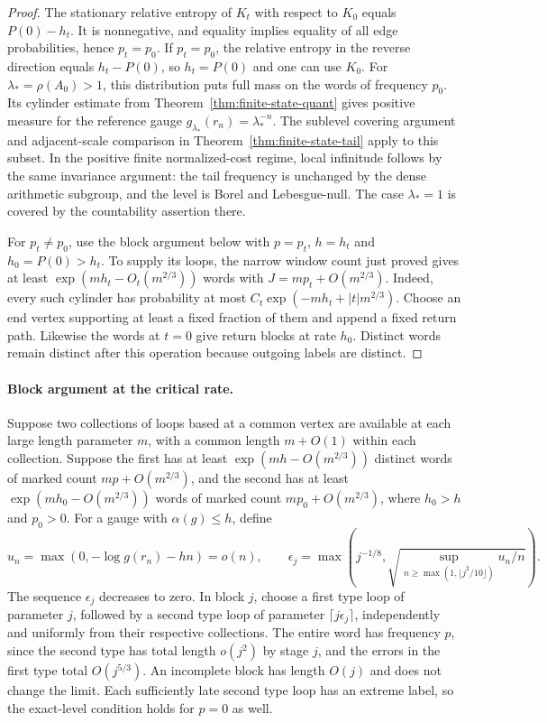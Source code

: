 \documentclass[11pt]{article}
\theoremstyle{definition}
\theoremstyle{remark}
\begin{document}
\begin{proof}
The stationary relative entropy of $K_t$ with respect to $K_0$
equals $P(0)-h_t$. It is nonnegative, and equality implies equality
of all edge probabilities, hence $p_t=p_0$. If $p_t=p_0$, the
relative entropy in the reverse direction equals $h_t-P(0)$,
so $h_t=P(0)$ and one can use $K_0$.
For $\lambda_*=\rho(A_0)>1$, this distribution puts full mass on
the words of frequency $p_0$. Its cylinder estimate from
Theorem~\ref{thm:finite-state-quant} gives positive measure for
the reference gauge $g_{\lambda_*}(r_n)=\lambda_*^{-n}$.
The sublevel covering argument and adjacent-scale comparison in
Theorem~\ref{thm:finite-state-tail} apply to this subset. In the
positive finite normalized-cost regime, local infinitude follows
by the same invariance argument: the tail frequency is unchanged
by the dense arithmetic subgroup, and the level is Borel and
Lebesgue-null. The case $\lambda_*=1$ is covered by the
countability assertion there.

For $p_t\ne p_0$, use the block argument below with $p=p_t$,
$h=h_t$ and $h_0=P(0)>h_t$. To supply its loops, the narrow
window count just proved gives at least
$\exp(mh_t-O_t(m^{2/3}))$ words with $J=mp_t+O(m^{2/3})$.
Indeed, every such cylinder has probability at most
$C_t\exp(-mh_t+|t|m^{2/3})$. Choose an end vertex supporting
at least a fixed fraction of them and append a fixed return path.
Likewise the words at $t=0$ give return blocks at rate $h_0$.
Distinct words remain distinct after this operation because
outgoing labels are distinct.
\end{proof}

\paragraph{Block argument at the critical rate.}
Suppose two collections of loops based at a common vertex are
available at each large length parameter $m$, with a common
length $m+O(1)$ within each collection. Suppose the first has
at least $\exp(mh-O(m^{2/3}))$ distinct words of marked count
$mp+O(m^{2/3})$, and the second has at least
$\exp(mh_0-O(m^{2/3}))$ words of marked count
$mp_0+O(m^{2/3})$, where $h_0>h$ and $p_0>0$.
For a gauge with $\alpha(g)\le h$, define
\[
 u_n=\max(0,-\log g(r_n)-hn)=o(n),\qquad
 \epsilon_j=\max\!\left(j^{-1/8},
   \sqrt{\sup_{n\ge\max(1,\lfloor j^2/10\rfloor)}u_n/n}\right).
\]
The sequence $\epsilon_j$ decreases to zero. In block $j$, choose
a first type loop of parameter $j$, followed by a second type
loop of parameter $\lceil j\epsilon_j\rceil$, independently and
uniformly from their respective collections. The entire word has
frequency $p$, since the second type has total length $o(j^2)$
by stage $j$, and the errors in the first type total $O(j^{5/3})$.
An incomplete block has length $O(j)$ and does not change the
limit. Each sufficiently late second type loop has an extreme
label, so the exact-level condition holds for $p=0$ as well.
\end{document}
